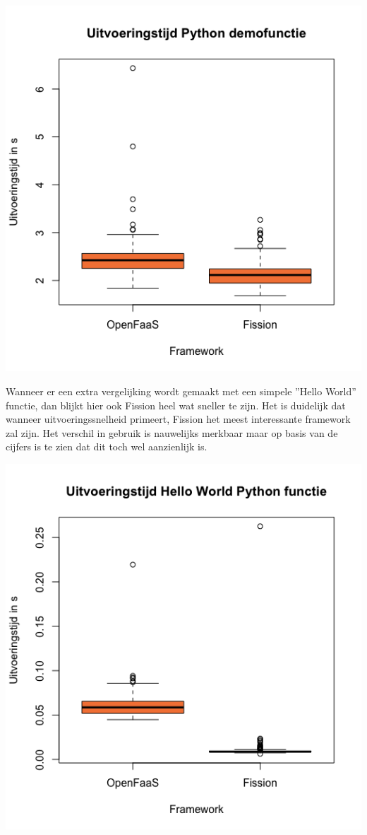 \documentclass[a0,portrait]{a0poster}
\begin{document}
\begin{multicols}{2}
\begin{center}\vspace{1cm}
\includegraphics[width=0.5\linewidth]{boxplot-uitvoeringstijd-demofunctie}
\end{center}\vspace{1cm}

 Wanneer er een extra vergelijking wordt gemaakt met een simpele ''Hello World'' functie, dan blijkt hier ook Fission heel wat sneller te zijn. Het is duidelijk dat wanneer uitvoeringssnelheid primeert, Fission het meest interessante framework zal zijn. Het verschil in gebruik is nauwelijks merkbaar maar op basis van de cijfers is te zien dat dit toch wel aanzienlijk is.
 
\begin{center}\vspace{1cm}
    \includegraphics[width=0.5\linewidth]{boxplot-uitvoeringstijd-hellofunctie}
\end{center}\vspace{1cm}




\end{multicols}
\end{document}

